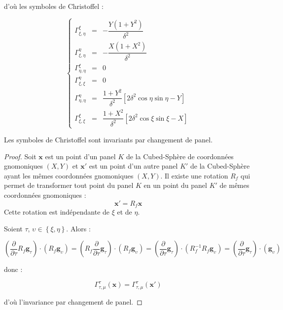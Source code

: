 d'où les symboles de Christoffel :

\begin{equation}
\left\lbrace
\begin{array}{rcl}
\Gamma_{\xi,\eta}^{\xi} & = & - \dfrac{Y ( 1+Y^2)}{\delta^2}\\
\Gamma_{\xi,\eta}^{\eta} & = & - \dfrac{X(1+X^2)}{\delta^2}\\
\Gamma_{\eta,\eta}^{\xi} & = & 0 \\
\Gamma_{\xi,\xi}^{\eta} & = & 0 \\
\Gamma_{\eta,\eta}^{\eta} & = & \dfrac{1+Y^2}{\delta^2} \left[ 2 \delta^2 \cos \eta \sin \eta - Y \right]\\
\Gamma_{\xi,\xi}^{\xi} & = & \dfrac{1+X^2}{\delta^2} \left[ 2 \delta^2 \cos \xi \sin \xi - X \right]
\end{array}
\right.
\end{equation}

\begin{proposition}
Les symboles de Christoffel sont invariants par changement de panel.
\end{proposition}

\begin{proof}
Soit $\mathbf{x}$ est un point d'un panel $K$ de la Cubed-Sphère de coordonnées gnomoniques $(X,Y)$ et $\mathbf{x}'$ est un point d'un autre panel $K'$ de la Cubed-Sphère ayant les mêmes coordonnées gnomoniques $(X,Y)$. Il existe une rotation $R_f$ qui permet de transformer tout point du panel $K$ en un point du panel $K'$ de mêmes coordonnées gnomoniques :
\begin{equation}
\mathbf{x}' = R_f \mathbf{x}
\end{equation}
Cette rotation est indépendante de $\xi$ et de $\eta$.

Soient $\tau$, $\upsilon \in \left\lbrace \xi, \eta \right\rbrace$. Alors :

$$\left( \dfrac{\partial}{\partial \tau}  R_f \mathbf{g}_{\tau} \right) \cdot \left( R_f \mathbf{g}_{\upsilon} \right) = \left( R_f \dfrac{\partial}{\partial \tau}   \mathbf{g}_{\tau} \right) \cdot \left( R_f \mathbf{g}_{\upsilon} \right) =  \left( \dfrac{\partial}{\partial \tau}  \mathbf{g}_{\tau} \right) \cdot \left( R_f^{-1} R_f \mathbf{g}_{\upsilon} \right) =  \left( \dfrac{\partial}{\partial \tau}  \mathbf{g}_{\tau} \right) \cdot \left( \mathbf{g}_{\upsilon} \right)$$

donc :

$$\Gamma_{\tau, \mu}^{\tau}(\mathbf{x})=\Gamma_{\tau, \mu}^{\tau}(\mathbf{x}')$$

d'où l'invariance par changement de panel.
\end{proof}


